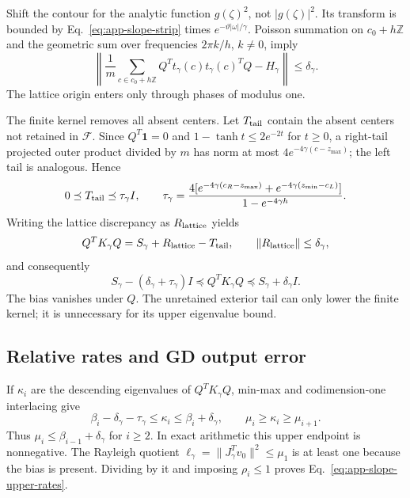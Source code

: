 Shift the contour for the analytic function $g(\zeta)^2$, not $|g(\zeta)|^2$.
Its transform is bounded by Eq.~\eqref{eq:app-slope-strip} times
$e^{-\vartheta|\omega|/\gamma}$. Poisson summation on $c_0+h\mathbb Z$
and the geometric sum over frequencies $2\pi k/h$, $k\ne0$, imply
\begin{equation}
 \left\|\frac1m\sum_{c\in c_0+h\mathbb Z}
 Q^Tt_\gamma(c)t_\gamma(c)^TQ-H_\gamma\right\|
 \le\delta_\gamma.
\end{equation}
The lattice origin enters only through phases of modulus one.

The finite kernel removes all absent centers. Let $T_{\rm tail}$ contain the
absent centers not retained in $\mathcal F$. Since $Q^T\mathbf1=0$ and
$1-\tanh t\le2e^{-2t}$ for $t\ge0$, a right-tail projected outer product
divided by $m$ has norm at most $4e^{-4\gamma(c-z_{\max})}$; the left tail
is analogous. Hence
\begin{equation}
 0\preceq T_{\rm tail}\preceq\tau_\gamma I,\qquad
 \tau_\gamma=\frac{4[e^{-4\gamma(c_R-z_{\max})}
 +e^{-4\gamma(z_{\min}-c_L)}]}{1-e^{-4\gamma h}}.
\end{equation}
Writing the lattice discrepancy as $R_{\rm lattice}$ yields
\begin{equation}
 Q^TK_\gamma Q=S_\gamma+R_{\rm lattice}-T_{\rm tail},\qquad
 \|R_{\rm lattice}\|\le\delta_\gamma,
\end{equation}
and consequently
\begin{equation}
 S_\gamma-(\delta_\gamma+\tau_\gamma)I
 \preceq Q^TK_\gamma Q\preceq S_\gamma+\delta_\gamma I.
 \label{eq:app-slope-enclosure}
\end{equation}
The bias vanishes under $Q$. The unretained exterior tail can only lower the
finite kernel; it is unnecessary for its upper eigenvalue bound.

\subsection{Relative rates and GD output error}
If $\kappa_i$ are the descending eigenvalues of $Q^TK_\gamma Q$, min-max and
codimension-one interlacing give
\begin{equation}
 \beta_i-\delta_\gamma-\tau_\gamma\le\kappa_i\le\beta_i+\delta_\gamma,
 \qquad \mu_i\ge\kappa_i\ge\mu_{i+1}.
\end{equation}
Thus $\mu_i\le\beta_{i-1}+\delta_\gamma$ for $i\ge2$. In exact arithmetic
this upper endpoint is nonnegative. The Rayleigh quotient
$\ell_\gamma=\|J_\gamma^Tv_0\|^2\le\mu_1$ is at least one because the bias
is present. Dividing by it and imposing $\rho_i\le1$ proves
Eq.~\eqref{eq:app-slope-upper-rates}.

